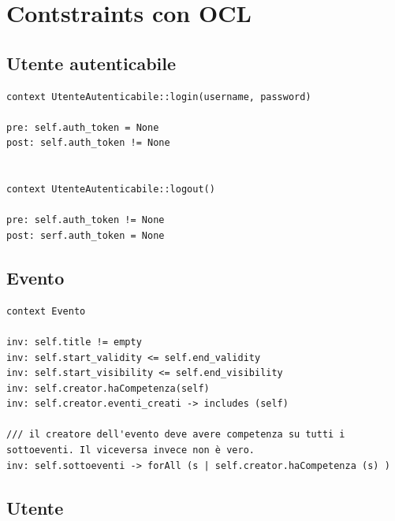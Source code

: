 \documentclass{article}
\begin{document}
\section{Contstraints con OCL}



\subsection{Utente autenticabile}

\begin{verbatim}
context UtenteAutenticabile::login(username, password)

pre: self.auth_token = None
post: self.auth_token != None


context UtenteAutenticabile::logout()

pre: self.auth_token != None
post: serf.auth_token = None
\end{verbatim}

\subsection{Evento}



\begin{verbatim}
context Evento

inv: self.title != empty
inv: self.start_validity <= self.end_validity
inv: self.start_visibility <= self.end_visibility
inv: self.creator.haCompetenza(self)
inv: self.creator.eventi_creati -> includes (self)

/// il creatore dell'evento deve avere competenza su tutti i sottoeventi. Il viceversa invece non è vero. 
inv: self.sottoeventi -> forAll (s | self.creator.haCompetenza (s) )
\end{verbatim}

\subsection{Utente}
\end{document}
